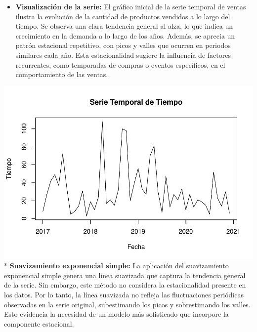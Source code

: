 \documentclass[
]{book}
\newenvironment{Shaded}{\begin{snugshade}}{\end{snugshade}}
\newcommand{\AttributeTok}[1]{\textcolor[rgb]{0.13,0.29,0.53}{#1}}
\newcommand{\CommentTok}[1]{\textcolor[rgb]{0.56,0.35,0.01}{\textit{#1}}}
\newcommand{\DecValTok}[1]{\textcolor[rgb]{0.00,0.00,0.81}{#1}}
\newcommand{\FunctionTok}[1]{\textcolor[rgb]{0.13,0.29,0.53}{\textbf{#1}}}
\newcommand{\NormalTok}[1]{#1}
\newcommand{\OtherTok}[1]{\textcolor[rgb]{0.56,0.35,0.01}{#1}}
\newcommand{\SpecialCharTok}[1]{\textcolor[rgb]{0.81,0.36,0.00}{\textbf{#1}}}
\newcommand{\StringTok}[1]{\textcolor[rgb]{0.31,0.60,0.02}{#1}}
\providecommand{\tightlist}{%
  \setlength{\itemsep}{0pt}\setlength{\parskip}{0pt}}
\begin{document}
\begin{itemize}
\tightlist
\item
  \textbf{Visualización de la serie:} El gráfico inicial de la serie temporal de ventas ilustra la evolución de la cantidad de productos vendidos a lo largo del tiempo. Se observa una clara tendencia general al alza, lo que indica un crecimiento en la demanda a lo largo de los años. Además, se aprecia un patrón estacional repetitivo, con picos y valles que ocurren en periodos similares cada año. Esta estacionalidad sugiere la influencia de factores recurrentes, como temporadas de compras o eventos específicos, en el comportamiento de las ventas.
\end{itemize}

\begin{Shaded}
\end{Shaded}

\includegraphics{_main_files/figure-latex/unnamed-chunk-24-1.pdf}
* \textbf{Suavizamiento exponencial simple:} La aplicación del suavizamiento exponencial simple genera una línea suavizada que captura la tendencia general de la serie. Sin embargo, este método no considera la estacionalidad presente en los datos. Por lo tanto, la línea suavizada no refleja las fluctuaciones periódicas observadas en la serie original, subestimando los picos y sobrestimando los valles. Esto evidencia la necesidad de un modelo más sofisticado que incorpore la componente estacional.
\end{document}
